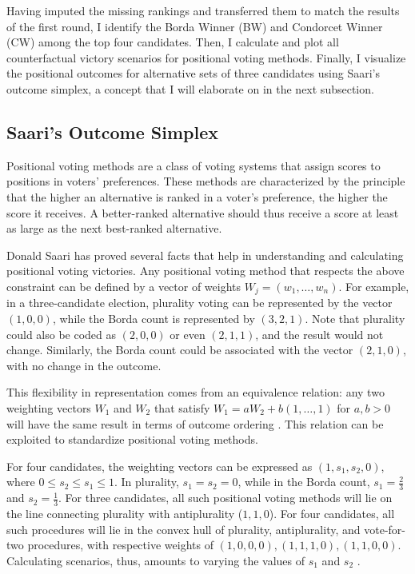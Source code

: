 \documentclass[hidelinks,11pt]{article} \usepackage[utf8]{inputenc}
\begin{document}
Having imputed the missing rankings and transferred them to match the results of
the first round, I identify the Borda Winner (BW) and Condorcet Winner (CW)
among the top four candidates. Then, I calculate and plot all counterfactual
victory scenarios for positional voting methods. Finally, I visualize the
positional outcomes for alternative sets of three candidates using Saari's
outcome simplex, a concept that I will elaborate on in the next subsection.

\subsection{Saari's Outcome Simplex}

Positional voting methods are a class of voting systems that assign scores to
positions in voters' preferences. These methods are characterized by the
principle that the higher an alternative is ranked in a voter's preference, the
higher the score it receives. A better-ranked alternative should thus receive a
score at least as large as the next best-ranked alternative.

Donald Saari has proved several facts that help in understanding and calculating
positional voting victories. Any positional voting method that respects the
above constraint can be defined by a vector of weights
\(W_{j} = (w_{1}, \ldots, w_{n})\). For example, in a three-candidate election,
plurality voting can be represented by the vector \((1,0,0)\), while the Borda
count is represented by \((3,2,1)\). Note that plurality could
also be coded as \((2,0,0)\) or even \((2,1,1)\), and the result would not
change. Similarly, the Borda count could be associated with the vector
\((2,1,0)\), with no change in the outcome.

This flexibility in representation comes from an equivalence relation: any two
weighting vectors \(W_{1}\) and \(W_{2}\) that satisfy
\(W_{1} = aW_{2} + b(1,\ldots, 1)\) for \(a,b > 0\) will have the same result in
terms of outcome ordering \parencite{saari1995basic}. This relation can be
exploited to standardize positional voting methods.

For four candidates, the weighting vectors can be expressed as
\((1,s_{1},s_{2},0)\), where \(0 \leq s_{2} \leq s_{1} \leq 1\). In plurality,
\(s_{1} = s_{2} = 0\), while in the Borda count, \(s_{1} = \frac{2}{3}\) and
\(s_{2} = \frac{1}{3}\). For three candidates, all such positional voting
methods will lie on the line connecting plurality with antiplurality
(\(1,1,0\)). For four candidates, all such procedures will lie in the convex
hull of plurality, antiplurality, and vote-for-two procedures, with respective
weights of \((1,0,0,0), (1,1,1,0), (1,1,0,0)\). Calculating scenarios, thus,
amounts to varying the values of \(s_{1}\) and \(s_{2}\)
\parencite{saari1995basic, saari2001chaotic}.
\end{document}
